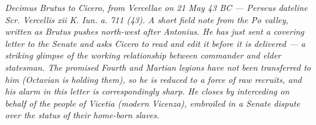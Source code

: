 
\textit{Decimus Brutus to Cicero, from Vercellae on 21 May 43 BC ---
Perseus dateline \textit{Scr. Vercellis xii K. Iun. a. 711 (43)}. A short
field note from the Po valley, written as Brutus pushes north-west after
Antonius. He has just sent a covering letter to the Senate and asks Cicero
to read and edit it before it is delivered --- a striking glimpse of the
working relationship between commander and elder statesman. The promised
Fourth and Martian legions have not been transferred to him (Octavian is
holding them), so he is reduced to a force of raw recruits, and his alarm
in this letter is correspondingly sharp. He closes by interceding on behalf
of the people of Vicetia (modern Vicenza), embroiled in a Senate dispute
over the status of their home-born slaves.}
